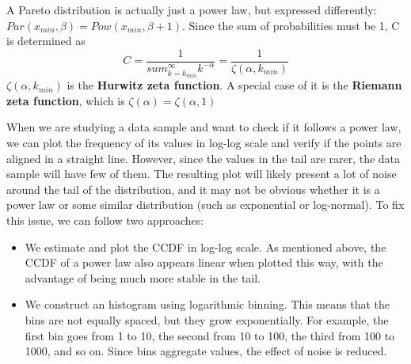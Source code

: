 A Pareto distribution is actually just a power law, but expressed differently: \\
$Par(x_{min}, \beta) = Pow(x_{min}, \beta + 1)$.
Since the sum of probabilities must be 1, C is determined as
\begin{equation*}
    C = \frac{1}{sum_{k=k_{min}}^{\infty} k^{-\alpha}} = \frac{1}{\zeta(\alpha, k_{min})}
\end{equation*}
$\zeta(\alpha, k_{min})$ is the \textbf{Hurwitz zeta function}. A special case of it is the \textbf{Riemann zeta function}, which is $\zeta(\alpha) = \zeta(\alpha, 1)$

When we are studying a data sample and want to check if it follows a power law, we can plot the frequency of its values in log-log scale and verify if the points are aligned in a straight line. However, since the values in the tail are rarer, the data sample will have few of them. The resulting plot will likely present a lot of noise around the tail of the distribution, and it may not be obvious whether it is a power law or some similar distribution (such as exponential or log-normal). To fix this issue, we can follow two approaches:
\begin{itemize}
    \item We estimate and plot the CCDF in log-log scale. As mentioned above, the CCDF of a power law also appears linear when plotted this way, with the advantage of being much more stable in the tail.
    \item We construct an histogram using logarithmic binning. This means that the bins are not equally spaced, but they grow exponentially. For example, the first bin goes from 1 to 10, the second from 10 to 100, the third from 100 to 1000, and so on. Since bins aggregate values, the effect of noise is reduced.
\end{itemize}

